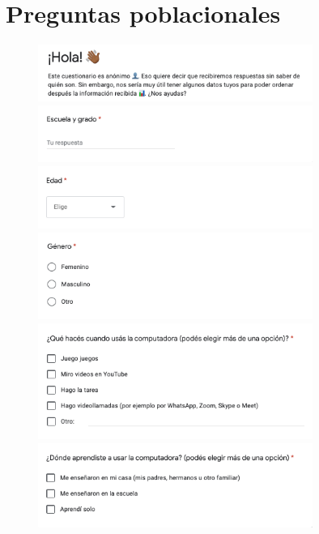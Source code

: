 \section{Preguntas poblacionales}
\begin{figure}[H]
    \centering
    \includegraphics[width=0.8\textwidth]{imagenes_anexo/a.png}
    \includegraphics[width=0.8\textwidth]{imagenes_anexo/b.png}
    \includegraphics[width=0.8\textwidth]{imagenes_anexo/d.png}
    \includegraphics[width=0.8\textwidth]{imagenes_anexo/e.png}
    \includegraphics[width=0.8\textwidth]{imagenes_anexo/f.png}
    \includegraphics[width=0.8\textwidth]{imagenes_anexo/g.png}
\end{figure}
